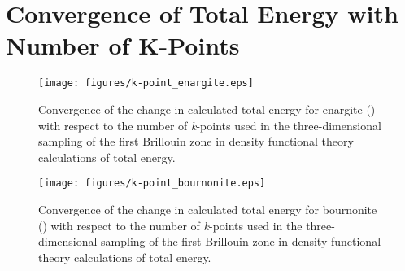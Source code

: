 \chapter{Convergence of Total Energy with Number of K-Points}\label{k-points}

\begin{figure}[h!]
  \centering
    \texttt{[image: figures/k-point\_enargite.eps]}
    \caption{Convergence of the change in calculated total energy for enargite ({\enargite}) with respect to the number of \textit{k}-points used in the three-dimensional sampling of the first Brillouin zone in density functional theory calculations of total energy.}
  \label{k-point_enargite}
\end{figure}

\begin{figure}[h!]
  \centering
    \texttt{[image: figures/k-point\_bournonite.eps]}
    \caption{Convergence of the change in calculated total energy for bournonite ({\bournonite}) with respect to the number of \textit{k}-points used in the three-dimensional sampling of the first Brillouin zone in density functional theory calculations of total energy.}
  \label{k-point_bournonite}
\end{figure}


